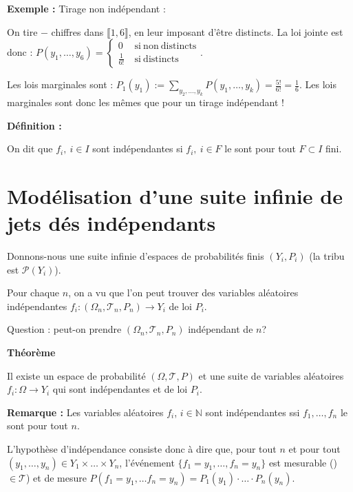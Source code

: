 \documentclass[10pt,a4paper,notitlepage ]{report}
\newcommand{\1}{\mathds 1}
\newenvironment{definition}[1][]{
	
	\textbf{Définition #1 : }
}
{}
\newcounter{th}
\newenvironment{theorem}[1][]{
\refstepcounter{th}
\begin{tcolorbox}
	\textbf{Théorème \theth \ #1}
	
	
}{\end{tcolorbox}}
\newenvironment{exemple}{
	
	\textbf{Exemple :} }{}
\newenvironment{rem}{
	
		\textbf{Remarque :}}{}
\begin{document}
\begin{exemple}
	Tirage non indépendant :
	
	On tire $-$ chiffres dans $\llbracket 1,6 \rrbracket$, en leur imposant d'être distincts. La loi jointe est donc : $P(y_1, \dots, y_6) = \begin{cases}
		0 &\mathrm{\ si\  non\  distincts} \\
		\frac{1}{6!} &\mathrm{\ si\ distincts}
	\end{cases}$.

	Les lois marginales sont : $P_1(y_1):= \underset{y_2,\dots,y_k}{\sum} P(y_1,\dots,y_k) = \frac{5!}{6!} = \frac{1}{6}$. Les lois marginales sont donc les mêmes que pour un tirage indépendant !
\end{exemple}
\begin{definition}
	On dit que $f_i,\ i\in I$ sont indépendantes si $f_i,\ i\in F$ le sont pour tout $F\subset I$ fini.
\end{definition}

\section{Modélisation d'une suite infinie de jets dés indépendants}

Donnons-nous une suite infinie d'espaces de probabilités finis $(Y_i,P_i)$ (la tribu est $\mathcal P(Y_i)$).

Pour chaque $n$, on a vu que l'on peut trouver des variables aléatoires indépendantes $f_i:(\Omega_n,\mathcal T_n, P_n) \rightarrow Y_i$ de loi $P_i$.

Question : peut-on prendre $(\Omega_n,\mathcal T_n, P_n)$ indépendant de $n$?

\begin{theorem}
	Il existe un espace de probabilité $(\Omega,\mathcal T, P)$ et une suite de variables aléatoires $f_i : \Omega \rightarrow Y_i$ qui sont indépendantes et de loi $P_i$.
\end{theorem}

\begin{rem}
	Les variables aléatoires $f_i$, $i\in \mathbb N$ sont indépendantes ssi $f_1, \dots, f_n$ le sont pour tout $n$.
\end{rem}

L'hypothèse d'indépendance consiste donc à dire que, pour tout $n$ et pour tout $(y_1, \dots, y_n) \in Y_1 \times \dots \times Y_n$, l'événement $\{f_1=y_1,\dots,f_n=y_n\}$ est mesurable ()$\in\mathcal T$) et de mesure $P(f_1=y_1, \dots f_n=y_n) = P_1(y_1)\cdot\dots\cdot P_n(y_n)$.
\end{document}
